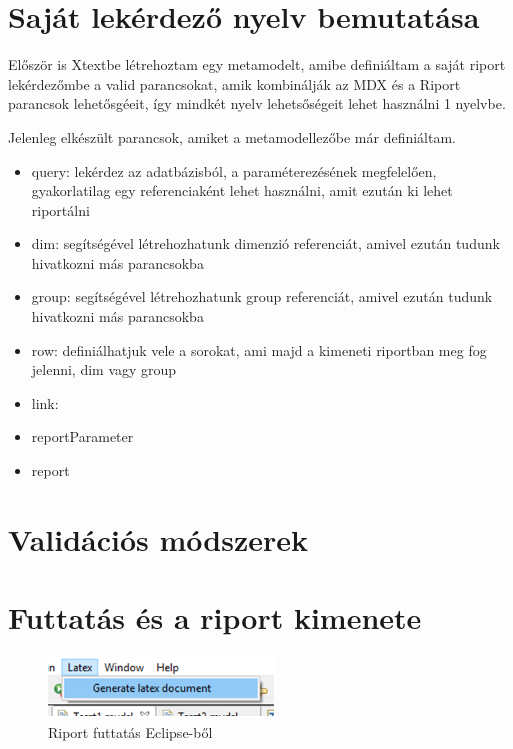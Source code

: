 \section{Saját lekérdező nyelv bemutatása}

Először is Xtextbe létrehoztam egy metamodelt, amibe definiáltam a saját riport
lekérdezőmbe a valid parancsokat, amik kombinálják az MDX és a Riport parancsok
lehetősgéeit, így mindkét nyelv lehetsőségeit lehet használni 1 nyelvbe.

Jelenleg elkészült parancsok, amiket a metamodellezőbe már definiáltam.
\begin{itemize}
  \item query: lekérdez az adatbázisból, a paraméterezésének megfelelően,
  gyakorlatilag egy referenciaként lehet használni, amit ezután ki lehet
  riportálni
  \item dim: segítségével létrehozhatunk dimenzió referenciát, amivel ezután
  tudunk hivatkozni más parancsokba
  \item group: segítségével létrehozhatunk group referenciát, amivel ezután
  tudunk hivatkozni más parancsokba
  \item row: definiálhatjuk vele a sorokat, ami majd a kimeneti riportban meg
  fog jelenni, dim vagy group
  \item link: 
  \item reportParameter
  \item report
\end{itemize}


\section{Validációs módszerek}

\section{Futtatás és a riport kimenete}
 \begin{figure}[!ht]
\centering
\includegraphics[width=60mm, keepaspectratio]{figures/run.png}
\caption{Riport futtatás Eclipse-ből} 
\label{fig:Overview}
\end{figure}



